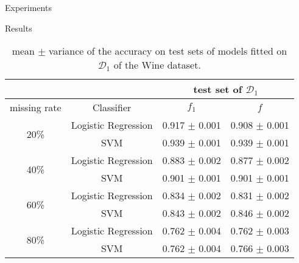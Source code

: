 \documentclass[xcolor={dvipsnames}]{beamer} %
\begin{document}
\begin{frame}{Experiments}
    \begin{block}{Results}
        \begin{table}[htbp]
        \caption{mean $\pm$ variance of the accuracy on test sets of  models fitted on $\mathcal{D}_1$ of the Wine dataset.}
\label{tab-imputation}
\begin{center}
\small
\begin{tabular}{|c|c|c|c|}

\hline
\multicolumn{2}{|c|}{}& \multicolumn{2}{|c|}{\bf test set of $\mathcal{D}_1$}
\\ \hline 
\multicolumn{1}{|c|}{missing rate}&\multicolumn{1}{|c|}{Classifier}& \multicolumn{1}{|c|}{\bf ${f}_1$}  &\multicolumn{1}{|c|}{\bf ${f}$} 
\\ \hline 
\multirow{2}{*}{20\%}&Logistic Regression  & 0.917 $\pm$ 0.001 & 0.908 $\pm$ 0.001 \\ \cline{2-4}
&SVM & 0.939 $\pm$ 0.001 & 0.939 $\pm$ 0.001 \\\hline
\multirow{2}{*}{40\%}&Logistic Regression  & 0.883 $\pm$ 0.002 & 0.877 $\pm$ 0.002 \\ \cline{2-4}
&SVM & 0.901 $\pm$ 0.001 & 0.901 $\pm$ 0.001 \\ \hline
\multirow{2}{*}{60\%}&Logistic Regression  & 0.834 $\pm$ 0.002 & 0.831 $\pm$ 0.002\\ \cline{2-4}
&SVM & 0.843 $\pm$ 0.002 & 0.846 $\pm$ 0.002\\\hline
\multirow{2}{*}{80\%}&Logistic Regression  & 0.762 $\pm$ 0.004 & 0.762 $\pm$ 0.003\\ \cline{2-4}
&SVM & 0.762 $\pm$ 0.004 & 0.766 $\pm$ 0.003 \\\hline
\end{tabular}
\end{center}
        \end{table}
    \end{block}
\end{frame}
\end{document}
